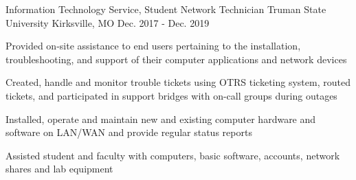 \vspace{-1mm}
\vspace{-0.5mm}
\begin{cventries}
  \cventry
    {Information Technology Service, Student Network Technician}
    {Truman State University}
    {Kirksville, MO}
    {Dec. 2017 - Dec. 2019}
    {
      \begin{cvitems}
        \vspace{0.5mm}
        \item {Provided on-site assistance to end users pertaining to the installation, troubleshooting, and support of their computer applications and network devices}
        \vspace{0.5mm}
        \item {Created, handle and monitor trouble tickets using OTRS ticketing system, routed tickets, and participated in support bridges with on-call groups during outages}
        \vspace{0.5mm}
        \item {Installed, operate and maintain new and existing computer hardware and software on LAN/WAN and provide regular status reports}
        \vspace{0.5mm}
        \item {Assisted student and faculty with computers, basic software, accounts, network shares and lab equipment}
      \end{cvitems}
      \vspace{-0.5mm}
    }
\end{cventries}
